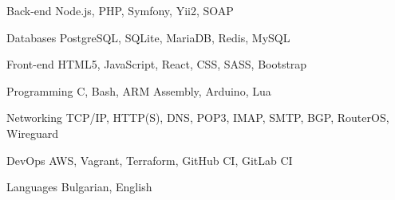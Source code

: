 

\begin{cvskills}

  \cvskill
    {Back-end} %
    {Node.js, PHP, Symfony, Yii2, SOAP} %

  \cvskill
    {Databases} %
    {PostgreSQL, SQLite, MariaDB, Redis, MySQL} %

  \cvskill
    {Front-end} %
    {HTML5, JavaScript, React, CSS, SASS, Bootstrap} %

  \cvskill
    {Programming} %
    {C, Bash, ARM Assembly, Arduino, Lua} %

  \cvskill
    {Networking} %
    {TCP/IP, HTTP(S), DNS, POP3, IMAP, SMTP, BGP, RouterOS, Wireguard} %

  \cvskill
    {DevOps} %
    {AWS, Vagrant, Terraform, GitHub CI, GitLab CI} %

  \cvskill
    {Languages} %
    {Bulgarian, English} %

\end{cvskills}
